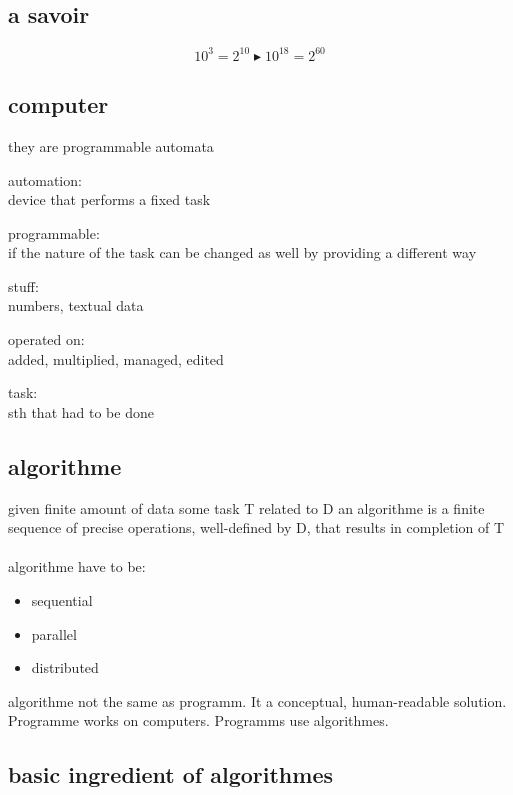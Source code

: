 \documentclass[a4paper,10pt]{article}
\begin{document}
\subsection{a savoir}
\begin{equation}
 10^3 = 2^{10}\blacktriangleright 10^{18} = 2^{60}
\end{equation}

\subsection{computer}
they are programmable automata
\begin{description}
 \item automation:\\{device that performs a fixed task}
 \item programmable:\\{if the nature of the task can be changed as well by providing a different way}
 \item stuff:\\{numbers, textual data}
 \item operated on:\\{added, multiplied, managed, edited}
 \item task:\\{sth that had to be done}
 \end{description}

 \subsection{algorithme}
 given finite amount of data
 \newline
 some task T related to D
 \newline
 an algorithme is a finite sequence of precise operations, well-defined by D, that results in completion of T
\paragraph{}
algorithme have to be:
 \begin{itemize}
  \item sequential
  \item parallel
  \item distributed
 \end{itemize}
algorithme not the same as programm. It a conceptual, human-readable solution. Programme works on computers. Programms use algorithmes.

\subsection{basic ingredient of algorithmes}
\end{document}
